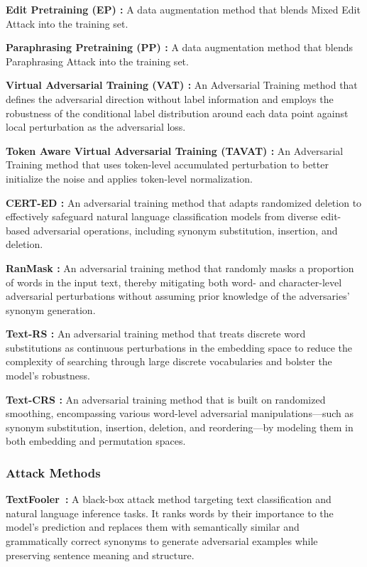 \noindent \textbf{Edit Pretraining (EP) \cite{wang2024comprehensive}:} 
A data augmentation method that blends Mixed Edit Attack into the training set.


\noindent \textbf{Paraphrasing Pretraining (PP) \cite{wang2024comprehensive}:} A data augmentation method that blends Paraphrasing Attack into the training set.


\noindent
\textbf{Virtual Adversarial Training (VAT) \cite{miyato2016virtual}:}
An Adversarial Training method that defines the adversarial direction without label information and employs the robustness of the conditional label distribution around each data point against local perturbation as the adversarial loss.


\noindent
\textbf{Token Aware Virtual Adversarial Training (TAVAT) \cite{li2021tavat}:}
An Adversarial Training method that uses token-level accumulated perturbation to better initialize the noise and applies token-level normalization.


\noindent
\textbf{CERT-ED \cite{huang2024cert}:}
An adversarial training method that adapts randomized deletion to effectively safeguard natural language classification models from diverse edit-based adversarial operations, including synonym substitution, insertion, and deletion.

\noindent
\textbf{RanMask \cite{zeng2023certified}:}
An adversarial training method that randomly masks a proportion of words in the input text, thereby mitigating both word- and character-level adversarial perturbations without assuming prior knowledge of the adversaries’ synonym generation.

\noindent
\textbf{Text-RS \cite{zhang2024random}:}
An adversarial training method that treats discrete word substitutions as continuous perturbations in the embedding space to reduce the complexity of searching through large discrete vocabularies and bolster the model’s robustness.

\noindent
\textbf{Text-CRS \cite{zhang2024text}:}
An adversarial training method that is built on randomized smoothing, encompassing various word-level adversarial manipulations—such as synonym substitution, insertion, deletion, and reordering—by modeling them in both embedding and permutation spaces.

\subsubsection{Attack Methods}
\label{sec:attack}
\noindent
\textbf{TextFooler~\cite{jin2020bert}:} 
A black-box attack method targeting text classification and natural language inference tasks. It ranks words by their importance to the model's prediction and replaces them with semantically similar and grammatically correct synonyms to generate adversarial examples while preserving sentence meaning and structure. 

